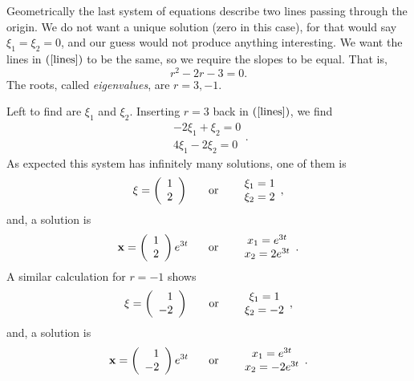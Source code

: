 \documentclass[leqno,DIV=calc,paper=a4,fontsize=11pt]{article}
\theoremstyle{definition}
\theoremstyle{plain}
\theoremstyle{remark}
\newcommand{\R}[1]{$(\ref{#1})$}
\begin{document}
Geometrically the last system of equations describe two lines passing
through the origin. We do not want a unique solution (zero in this
case), for that would say $\xi_1=\xi_2=0$, and our guess would not
produce anything interesting. We want the lines in \R{lines} to be
the same, so we require the slopes to be equal. That is,
\[
r^2-2r-3=0.
\]
The roots, called {\em eigenvalues}, are $r=3,-1$.

Left to find are $\xi_1$ and
$\xi_2$. Inserting $r=3$ back in \R{lines}, we find
\[
\begin{array}{c}-2\xi_1+\xi_2=0\\4\xi_1-2\xi_2=0\end{array}.
\]
As expected this system has infinitely many solutions, one of them is
\[
{\bf \xi} = \left(\begin{array}{c}1\\2\end{array}\right)
\hspace{.25in} \mbox{or} \hspace{.25in}
\begin{array}{c}\xi_1=1\\\xi_2=2\end{array},
\]
and, a solution is
\[
{\bf x} = \left(\begin{array}{c}1\\2\end{array}\right)e^{3t}
\hspace{.25in} \mbox{or} \hspace{.25in}
\begin{array}{c}x_1=e^{3t}\\x_2=2e^{3t}\end{array}.
\]
A similar calculation for $r=-1$ shows
\[
{\bf \xi} = \left(\begin{array}{r}1\\-2\end{array}\right)
\hspace{.25in} \mbox{or} \hspace{.25in}
\begin{array}{c}\xi_1=1\\\xi_2=-2\end{array},
\]
and, a solution is
\[
{\bf x} = \left(\begin{array}{r}1\\-2\end{array}\right)e^{3t}
\hspace{.25in} \mbox{or} \hspace{.25in}
\begin{array}{c}x_1=e^{3t}\\x_2=-2e^{3t}\end{array}.
\]
\end{document}
